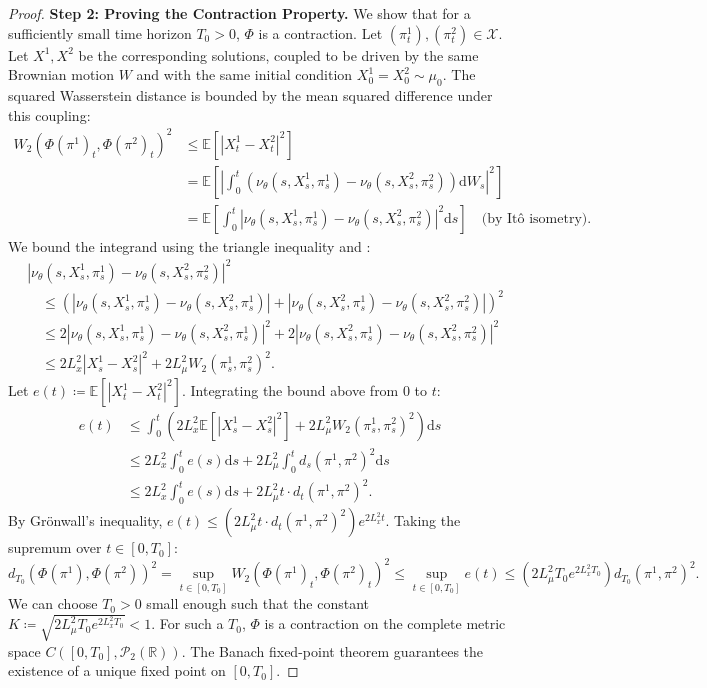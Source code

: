 \documentclass[qian]{imsart}
\newcommand{\R}{\mathbb{R}}
\newcommand{\E}{\mathbb{E}}
\newcommand{\Pcal}{\mathcal{P}}
\newcommand{\dd}{\mathrm{d}}
\newcommand{\abs}[1]{\left\lvert#1\right\rvert}
\theoremstyle{plain}
\theoremstyle{definition}
\begin{document}
\begin{proof}
\textbf{Step 2: Proving the Contraction Property.}
We show that for a sufficiently small time horizon $T_0 > 0$, $\Phi$ is a contraction. Let $(\pi^1_t), (\pi^2_t) \in \mathcal{X}$. Let $X^1, X^2$ be the corresponding solutions, coupled to be driven by the same Brownian motion $W$ and with the same initial condition $X^1_0 = X^2_0 \sim \mu_0$. The squared Wasserstein distance is bounded by the mean squared difference under this coupling:
\begin{align*}
W_2(\Phi(\pi^1)_t, \Phi(\pi^2)_t)^2 &\le \E[\abs{X^1_t - X^2_t}^2] \\
&= \E\left[ \abs{\int_0^t \left( \nu_\theta(s, X^1_s, \pi^1_s) - \nu_\theta(s, X^2_s, \pi^2_s) \right) \dd W_s}^2 \right] \\
&= \E\left[ \int_0^t \abs{\nu_\theta(s, X^1_s, \pi^1_s) - \nu_\theta(s, X^2_s, \pi^2_s)}^2 \dd s \right] \quad \text{(by Itô isometry)}.
\end{align*}
We bound the integrand using the triangle inequality and :
\begin{align*}
&\abs{\nu_\theta(s, X^1_s, \pi^1_s) - \nu_\theta(s, X^2_s, \pi^2_s)}^2 \\
&\quad\le \left( \abs{\nu_\theta(s, X^1_s, \pi^1_s) - \nu_\theta(s, X^2_s, \pi^1_s)} + \abs{\nu_\theta(s, X^2_s, \pi^1_s) - \nu_\theta(s, X^2_s, \pi^2_s)} \right)^2 \\
&\quad\le 2\abs{\nu_\theta(s, X^1_s, \pi^1_s) - \nu_\theta(s, X^2_s, \pi^1_s)}^2 + 2\abs{\nu_\theta(s, X^2_s, \pi^1_s) - \nu_\theta(s, X^2_s, \pi^2_s)}^2 \\
&\quad\le 2L_x^2 \abs{X^1_s - X^2_s}^2 + 2L_\mu^2 W_2(\pi^1_s, \pi^2_s)^2.
\end{align*}
Let $e(t) \coloneqq \E[\abs{X^1_t - X^2_t}^2]$. Integrating the bound above from $0$ to $t$:
\begin{align*}
e(t) &\le \int_0^t \left( 2L_x^2 \E[\abs{X^1_s - X^2_s}^2] + 2L_\mu^2 W_2(\pi^1_s, \pi^2_s)^2 \right) \dd s \\
&\le 2L_x^2 \int_0^t e(s) \dd s + 2L_\mu^2 \int_0^t d_s(\pi^1, \pi^2)^2 \dd s \\
&\le 2L_x^2 \int_0^t e(s) \dd s + 2L_\mu^2 t \cdot d_t(\pi^1, \pi^2)^2.
\end{align*}
By Grönwall's inequality, $e(t) \le (2L_\mu^2 t \cdot d_t(\pi^1, \pi^2)^2) e^{2L_x^2 t}$. Taking the supremum over $t \in [0, T_0]$:
\[ d_{T_0}(\Phi(\pi^1), \Phi(\pi^2))^2 = \sup_{t \in [0,T_0]} W_2(\Phi(\pi^1)_t, \Phi(\pi^2)_t)^2 \le \sup_{t \in [0,T_0]} e(t) \le \left( 2L_\mu^2 T_0 e^{2L_x^2 T_0} \right) d_{T_0}(\pi^1, \pi^2)^2. \]
We can choose $T_0 > 0$ small enough such that the constant $K \coloneqq \sqrt{2L_\mu^2 T_0 e^{2L_x^2 T_0}} < 1$. For such a $T_0$, $\Phi$ is a contraction on the complete metric space $C([0,T_0], \Pcal_2(\R))$. The Banach fixed-point theorem guarantees the existence of a unique fixed point on $[0,T_0]$.


\end{proof}
\end{document}
